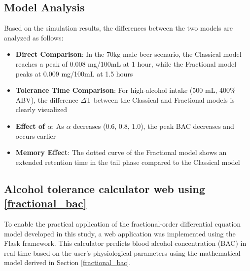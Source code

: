 \documentclass[11pt]{article}
\begin{document}
\subsection{Model Analysis}
Based on the simulation results, the differences between the two models are analyzed as follows:
\begin{itemize}
  \item \textbf{Direct Comparison}: In the 70kg male beer scenario, the Classical model reaches a peak of 0.008 mg/100mL at 1 hour, while the Fractional model peaks at 0.009 mg/100mL at 1.5 hours
  \item \textbf{Tolerance Time Comparison}: For high-alcohol intake (500 mL, 400\% ABV), the difference $\Delta$T between the Classical and Fractional models is clearly visualized
  \item \textbf{Effect of $\alpha$}: As $\alpha$ decreases (0.6, 0.8, 1.0), the peak BAC decreases and occurs earlier
  \item \textbf{Memory Effect}: The dotted curve of the Fractional model shows an extended retention time in the tail phase compared to the Classical model
\end{itemize}

\subsection{Alcohol tolerance calculator web using \ref{fractional_bac}}

To enable the practical application of the fractional-order differential equation model developed in this study, a web application was implemented using the Flask framework. This calculator predicts blood alcohol concentration (BAC) in real time based on the user’s physiological parameters using the mathematical model derived in Section \ref{fractional_bac}.
\end{document}
